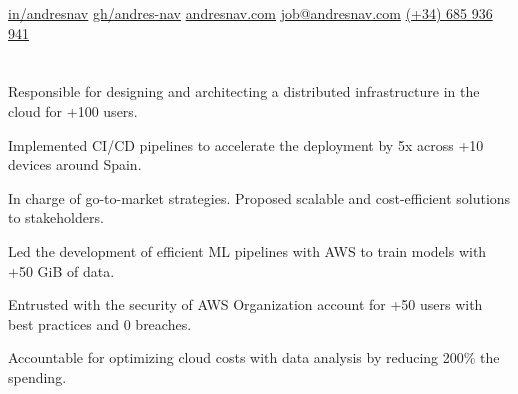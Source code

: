 \documentclass[]{cv}
\begin{document}
{} %
{\contactline%
	{\href{https://www.linkedin.com/in/andresnav}{in/andresnav}}
	{\href{https://www.github.com/andres-nav}{gh/andres-nav}}
	{\href{https://andresnav.com}{andresnav.com}}
	{\href{mailto:job@andresnav.com}{job@andresnav.com}}
	{\href{https://wa.me/+34685936941}{(+34) 685 936 941}}
}


\section{}


\section{}

\begin{tightemize}
	\item \dumblang%
	{Responsible for designing and architecting a distributed infrastructure in the cloud for +100 users.}
	{}
	\item \dumblang%
	{Implemented CI/CD pipelines to accelerate the deployment by 5x across +10 devices around Spain.}
	{}
	\item \dumblang%
	{In charge of go-to-market strategies. Proposed scalable and cost-efficient solutions to stakeholders.}
	{}
\end{tightemize}


{}
\begin{tightemize}
	\item \dumblang%
	{Led the development of efficient ML pipelines with AWS to train models with +50 GiB of data.}
	{}
	\item \dumblang%
	{Entrusted with the security of AWS Organization account for +50 users with best practices and 0 breaches.}
	{}
	\item \dumblang%
	{Accountable for optimizing cloud costs with data analysis by reducing 200\% the spending.}
	{}
\end{tightemize}
\end{document}
